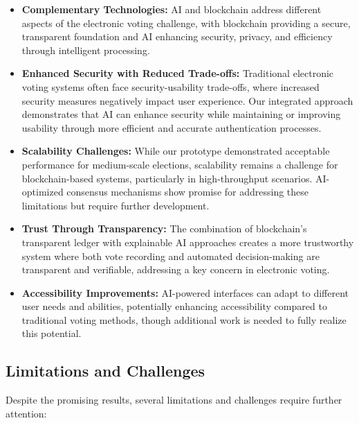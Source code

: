\documentclass[conference]{IEEEtran}
\begin{document}
\begin{itemize}
    \item \textbf{Complementary Technologies:} AI and blockchain address different aspects of the electronic voting challenge, with blockchain providing a secure, transparent foundation and AI enhancing security, privacy, and efficiency through intelligent processing.
    
    \item \textbf{Enhanced Security with Reduced Trade-offs:} Traditional electronic voting systems often face security-usability trade-offs, where increased security measures negatively impact user experience. Our integrated approach demonstrates that AI can enhance security while maintaining or improving usability through more efficient and accurate authentication processes.
    
    \item \textbf{Scalability Challenges:} While our prototype demonstrated acceptable performance for medium-scale elections, scalability remains a challenge for blockchain-based systems, particularly in high-throughput scenarios. AI-optimized consensus mechanisms show promise for addressing these limitations but require further development.
    
    \item \textbf{Trust Through Transparency:} The combination of blockchain's transparent ledger with explainable AI approaches creates a more trustworthy system where both vote recording and automated decision-making are transparent and verifiable, addressing a key concern in electronic voting.
    
    \item \textbf{Accessibility Improvements:} AI-powered interfaces can adapt to different user needs and abilities, potentially enhancing accessibility compared to traditional voting methods, though additional work is needed to fully realize this potential.
\end{itemize}

\subsection{Limitations and Challenges}
Despite the promising results, several limitations and challenges require further attention:
\end{document}
